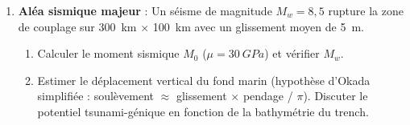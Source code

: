\documentclass[11pt]{article}
\begin{document}
\begin{exercice}
\begin{enumerate}
\item \textbf{Aléa sismique majeur} : Un séisme de magnitude $M_w = 8,5$ rupture la zone de couplage sur \SI{300}{km} $\times$ \SI{100}{km} avec un glissement moyen de \SI{5}{m}.
      \begin{enumerate}
      \item Calculer le moment sismique $M_0$ ($\mu = \SI{30}{GPa}$) et vérifier $M_w$.
      \item Estimer le déplacement vertical du fond marin (hypothèse d'Okada simplifiée : soulèvement $\approx$ glissement $\times$ pendage / $\pi$). Discuter le potentiel tsunami-génique en fonction de la bathymétrie du trench.
      \end{enumerate}
\end{enumerate}
\end{exercice}
\end{document}
